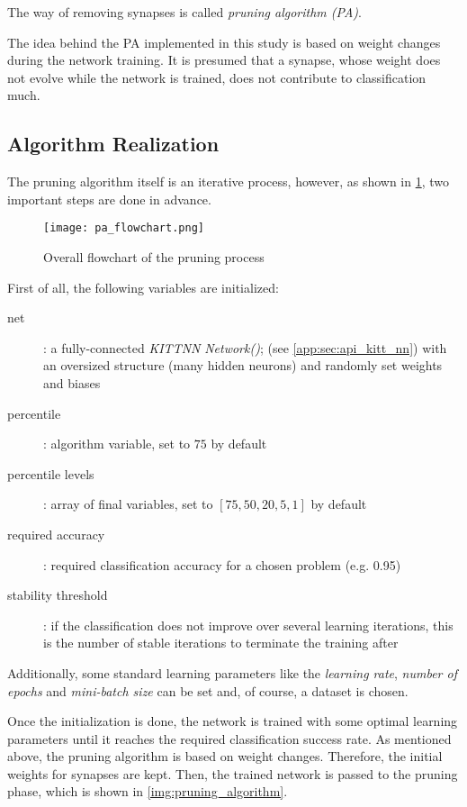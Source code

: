 The way of removing synapses is called \textit{pruning algorithm (PA)}.

The idea behind the PA implemented in this study is based on weight changes during the network training. It is presumed that a synapse, whose weight does not evolve while the network is trained, does not contribute to classification much. 

\subsection{Algorithm Realization} \label{ssec:pa_realization}
The pruning algorithm itself is an iterative process, however, as shown in \cref{img:pa_flowchart}, two important steps are done in advance.

\begin{figure}[H]
  \centering
  \texttt{[image: pa\_flowchart.png]}
  \caption{Overall flowchart of the pruning process}
  \label{img:pa_flowchart}
\end{figure}

First of all, the following variables are initialized:

\begin{description}
\item[net] : a fully-connected \textit{KITTNN} \textit{Network()}; (see \cref{app:sec:api_kitt_nn}) with an oversized structure (many hidden neurons) and randomly set weights and biases
\item[percentile] : algorithm variable, set to $ 75 $ by default
\item[percentile levels] : array of final variables, set to $ [75, 50, 20, 5, 1] $ by default
\item[required accuracy] : required classification accuracy for a chosen problem (e.g. 0.95)
\item[stability threshold] : if the classification does not improve over several learning iterations, this is the number of stable iterations to terminate the training after
\end{description}

Additionally, some standard learning parameters like the \textit{learning rate}, \textit{number of epochs} and \textit{mini-batch size} can be set and, of course, a dataset is chosen.

Once the initialization is done, the network is trained with some optimal learning parameters until it reaches the required classification success rate. As mentioned above, the pruning algorithm is based on weight changes. Therefore, the initial weights for synapses are kept. Then, the trained network is passed to the pruning phase, which is shown in \cref{img:pruning_algorithm}.

